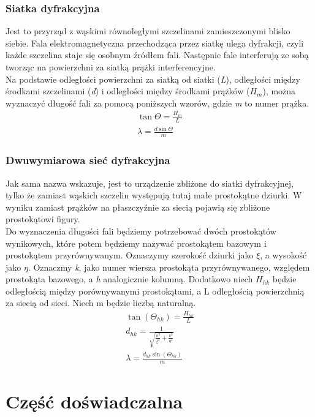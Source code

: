 \documentclass{article}
\begin{document}
\subsubsection{Siatka dyfrakcyjna}
Jest to przyrząd z wąskimi równoległymi szczelinami zamieszczonymi blisko siebie. Fala elektromagnetyczna przechodząca przez siatkę ulega dyfrakcji, czyli każde szczelina staje się osobnym źródłem fali. Następnie fale interferują ze sobą tworząc na powierzchni za siatką prążki interferencyjne. \\
Na podstawie odległości powierzchni za siatką od siatki (\textit{L}), odległości między środkami szczelinami (\textit{d}) i odległości między środkami prążków (\textit{$H_{m}$}), można wyznaczyć długość fali za pomocą poniższych wzorów, gdzie \textit{m} to numer prążka.
\begin{gather*}
    \tan\Theta = \frac{H_{m}}{L} \\
    \lambda = \frac{d\sin\Theta}{m}
\end{gather*}

\subsubsection{Dwuwymiarowa sieć dyfrakcyjna}
Jak sama nazwa wskazuje, jest to urządzenie zbliżone do siatki dyfrakcyjnej, tylko że zamiast wąskich szczelin występują tutaj małe prostokątne dziurki. W wyniku zamiast prążków na płaszczyźnie za siecią pojawią się zbliżone prostokątowi figury.\\
Do wyznaczenia długości fali będziemy potrzebować dwóch prostokątów wynikowych, które potem będziemy nazywać prostokątem bazowym i prostokątem przyrównywanym.
Oznaczymy szerokość dziurki jako \textit{$\xi$}, a wysokość jako \textit{$\eta$}. Oznaczmy \textit{k}, jako numer wiersza prostokąta przyrównywanego, względem prostokąta bazowego, a \textit{h} analogicznie kolumną. 
Dodatkowo niech \textit{$H_{hk}$} będzie odległością między porównywanymi prostokątami, a L odległością powierzchnią za siecią od sieci.
Niech m będzie liczbą naturalną.
\begin{gather*}
    \tan(\Theta_{hk}) = \frac{H_{hk}}{L} \\
    d_{hk} = \frac{1}{\sqrt{\frac{h^2}{\xi^2}+\frac{k^2}{\eta^2}}} \\
    \lambda = \frac{d_{hk}\sin(\Theta_{hk})}{m}
\end{gather*}

\clearpage
\section{Część doświadczalna}
\end{document}
